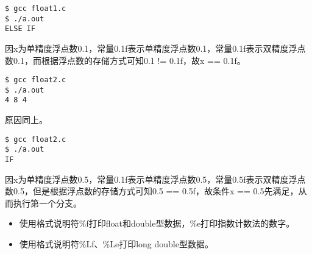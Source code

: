 \begin{frame}[fragile]

\end{frame}

\begin{frame}[fragile]
\begin{lstlisting}[backgroundcolor=\color{red!10}]
$ gcc float1.c
$ ./a.out 
ELSE IF
\end{lstlisting}\pause 


\begin{jieshi}
\tf 因x为单精度浮点数0.1，常量0.1f表示单精度浮点数0.1，常量0.1f表示双精度浮点数0.1，而根据浮点数的存储方式可知0.1 != 0.1f，故x == 0.1f。
\end{jieshi}
\end{frame}



\begin{frame}[fragile]

\end{frame}

\begin{frame}[fragile]
\begin{lstlisting}[backgroundcolor=\color{red!10}]
$ gcc float2.c
$ ./a.out 
4 8 4
\end{lstlisting}\pause 


\begin{jieshi}
\tf 原因同上。
\end{jieshi}
\end{frame}


\begin{frame}[fragile]

\end{frame}

\begin{frame}[fragile]
\begin{lstlisting}[backgroundcolor=\color{red!10}]
$ gcc float2.c
$ ./a.out 
IF
\end{lstlisting}\pause 


\begin{jieshi}
\tf 因x为单精度浮点数0.5，常量0.1f表示单精度浮点数0.5，常量0.5f表示双精度浮点数0.5，但是根据浮点数的存储方式可知0.5 == 0.5f，故条件x == 0.5先满足，从而执行第一个分支。
\end{jieshi}
\end{frame}

%
\begin{frame}[fragile]
\begin{itemize}
\item 使用格式说明符{\tf \%f}打印float和double型数据，{\tf \%e}打印指数计数法的数字。\\[0.1in]
\item 使用格式说明符{\tf \%Lf}、{\tf \%Le}打印long double型数据。
\end{itemize}
\end{frame}

